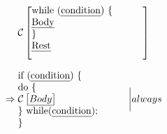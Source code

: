 \documentclass[12pt]{article}
\begin{document}
\begin{equation}
\mathcal{C} \left[
\parbox{4cm}{
while (\emph{condition}) \{\\
	\emph{Body}\\
\}\\
\emph{Rest}\\
}
\right]
\end{equation}

\begin{equation}
\Rightarrow \parbox{4cm}{
if (\emph{condition}) \{\\
	do \{\\
		$\mathcal{C} \left[ \emph{Body} \right]$ \\
	\} while(\emph{condition});\\
\}
}
\bigg| always
\end{equation}
\end{document}
